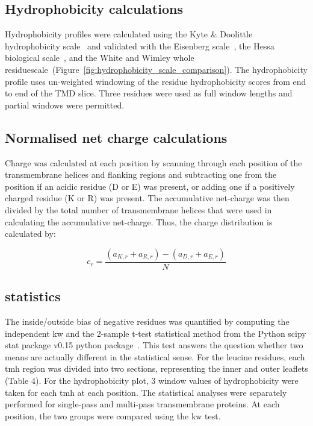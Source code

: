 \subsection{Hydrophobicity calculations}

Hydrophobicity profiles were calculated using the Kyte \& Doolittle hydrophobicity scale~\cite{Kyte1982} and validated with the Eisenberg scale~\cite{Eisenberg1984}, the Hessa biological scale~\cite{Hessa2005}, and the White and Wimley whole residuescale~\cite{White1999}(Figure~\ref{fig:hydrophobicity_scale_comparison}). The hydrophobicity profile uses un-weighted windowing of the residue hydrophobicity scores from end to end of the TMD slice. Three residues were used as full window lengths and partial windows were permitted.

\subsection{Normalised net charge calculations}

Charge was calculated at each position by scanning through each position of the transmembrane helices and flanking regions and subtracting one from the position if an acidic residue (D or E) was present, or adding one if a positively charged residue (K or R) was present. The accumulative net-charge  was then divided by the total number  of transmembrane helices that were used in calculating the accumulative net-charge. Thus, the charge distribution is calculated by:

\begin{equation} \label{eq:charge_equation}
c_r=\frac{(a_{K,r}+a_{R,r})-(a_{D,r}+a_{E,r})}{N}
\end{equation}

\subsection{statistics}

The inside/outside bias of negative residues was quantified by computing the independent \gls{kw} and the 2-sample t-test statistical method from the Python scipy stat package v0.15 python package~\cite{VanderWalt2011}. This test answers the question whether two means are actually different in the statistical sense. For the leucine residues, each \gls{tmh} region was divided into two sections, representing the inner and outer leaflets (Table 4).  For the hydrophobicity plot, 3 window values of hydrophobicity were taken for each \gls{tmh} at each position. The statistical analyses were separately performed for single-pass and multi-pass transmembrane proteins. At each position, the two groups were compared using the \gls{kw} test.

